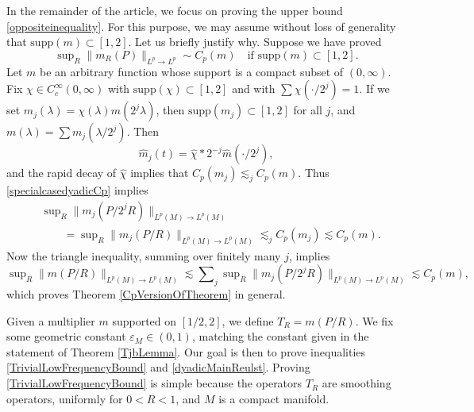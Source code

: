 In the remainder of the article, we focus on proving the upper bound \eqref{oppositeinequality}. For this purpose, we may assume without loss of generality that $\text{supp}(m) \subset [1,2]$. Let us briefly justify why. 
 Suppose we have proved
%
\begin{equation} \label{specialcasedyadicCp}
    \sup\nolimits_R \| m_R(P) \|_{L^p \to L^p} \sim C_p(m) \quad\text{if $\text{supp}(m) \subset [1,2]$.}
\end{equation}
%
Let $m$ be an arbitrary function whose support is a compact subset of $(0,\infty)$. Fix $\chi \in C_c^\infty(0,\infty)$ with $\text{supp}(\chi) \subset [1,2]$ and with $\sum \chi( \cdot / 2^j ) = 1$. If we set $m_j(\lambda) = \chi(\lambda) m(2^j \lambda)$, then $\text{supp}(m_j) \subset [1,2]$ for all $j$, and $m(\lambda) = \sum m_j(\lambda/2^j)$. Then
%
\begin{equation}
    \widehat{m}_j(t) = \widehat{\chi} * 2^{-j} \widehat{m}( \cdot / 2^j ),
\end{equation}
%
%
and the rapid decay of $\widehat{\chi}$ implies that $C_p(m_j) \lesssim_j C_p(m)$. Thus \eqref{specialcasedyadicCp} implies
%
\begin{equation}
\begin{split}
    &\sup\nolimits_R \| m_j(P/2^j R) \|_{L^p(M) \to L^p(M)}\\
    &\quad\quad= \sup\nolimits_R \| m_j(P/R) \|_{L^p(M) \to L^p(M)} \lesssim_j C_p(m_j) \lesssim C_p(m).
\end{split}
\end{equation}
%
Now the triangle inequality, summing over finitely many $j$, implies
%
\begin{equation}
    \sup\nolimits_R \| m(P/R) \|_{L^p(M) \to L^p(M)} \lesssim \sum\nolimits_j \sup\nolimits_R \| m_j(P/2^j R) \|_{L^p(M) \to L^p(M)} \lesssim C_p(m),
\end{equation}
%
which proves Theorem \ref{CpVersionOfTheorem} in general.

Given a multiplier $m$ supported on $[1/2,2]$, we define $T_R = m(P/R)$. We fix some geometric constant $\varepsilon_M \in (0,1)$, matching the constant given in the statement of Theorem \ref{TjbLemma}. Our goal is then to prove inequalities \eqref{TrivialLowFrequencyBound} and \eqref{dyadicMainReulst}. Proving \eqref{TrivialLowFrequencyBound} is simple because the operators $T_R$ are smoothing operators, uniformly for $0 < R < 1$, and $M$ is a compact manifold.

